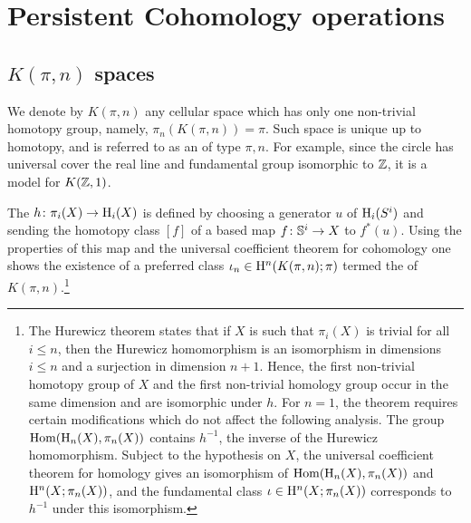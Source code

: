 
\section{Persistent Cohomology operations}\label{s:steenrod}



\subsection{$K(\pi, n)$ spaces}

We denote by $K(\pi, n)$ any cellular space which has only one non-trivial homotopy group, namely, $\pi_n(K(\pi, n)) = \pi$.
Such space is unique up to homotopy, and is referred to as an  of type $\pi,n$.
For example, since the circle has universal cover the real line and fundamental group isomorphic to $\mathbb{Z}$, it is a model for $K(\mathbb{Z},1)$.

The  $h \colon \pi_i(X) \rightarrow \mathrm{H}_i(X)$ is defined by choosing a generator $u$ of $\mathrm{H}_i(S^i)$ and sending the homotopy class $[f]$ of a based map $f \colon \mathbb{S}^i \to X$ to $f^*(u)$.
Using the properties of this map and the universal coefficient theorem for cohomology one shows the existence of a preferred class $\iota_n \in \mathrm{H}^n(K(\pi, n); \pi)$ termed the  of $K(\pi, n)$.\footnote{The Hurewicz theorem states that if $X$ is such that $\pi_i(X)$ is trivial for all $i \leq n$, then the Hurewicz homomorphism is an isomorphism in dimensions $i \leq n$ and a surjection in dimension $n+1$.
Hence, the first non-trivial homotopy group of $X$ and the first non-trivial homology group occur in the same dimension and are isomorphic under $h$.
For $n=1$, the theorem requires certain modifications which do not affect the following analysis.
The group $\mathrm{Hom}(\mathrm{H}_n(X), \pi_n(X))$ contains $h^{-1}$, the inverse of the Hurewicz homomorphism.
Subject to the hypothesis on $X$, the universal coefficient theorem for homology gives an isomorphism of $\mathrm{Hom}(\mathrm{H}_n(X), \pi_n(X))$ and $\mathrm{H}^n(X; \pi_n(X))$, and the fundamental class $\iota \in \mathrm{H}^n(X; \pi_n(X))$ corresponds to $h^{-1}$ under this isomorphism.}

